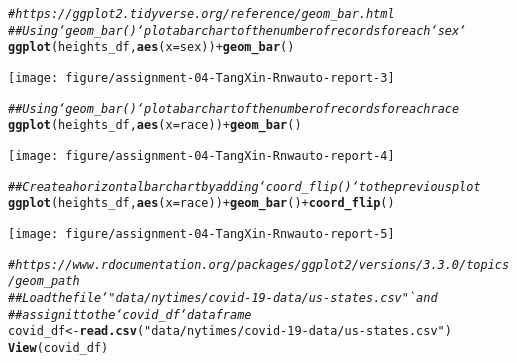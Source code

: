 \documentclass{article}\usepackage[]{graphicx}\usepackage[]{xcolor}
\makeatletter
\newcommand{\hlstr}[1]{\textcolor[rgb]{0.192,0.494,0.8}{#1}}%
\newcommand{\hlcom}[1]{\textcolor[rgb]{0.678,0.584,0.686}{\textit{#1}}}%
\newcommand{\hlopt}[1]{\textcolor[rgb]{0,0,0}{#1}}%
\newcommand{\hlstd}[1]{\textcolor[rgb]{0.345,0.345,0.345}{#1}}%
\newcommand{\hlkwb}[1]{\textcolor[rgb]{0.69,0.353,0.396}{#1}}%
\newcommand{\hlkwc}[1]{\textcolor[rgb]{0.333,0.667,0.333}{#1}}%
\newcommand{\hlkwd}[1]{\textcolor[rgb]{0.737,0.353,0.396}{\textbf{#1}}}%
\newenvironment{kframe}{%
 \def\at@end@of@kframe{}%
 \ifinner\ifhmode%
  \def\at@end@of@kframe{\end{minipage}}%
  \begin{minipage}{\columnwidth}%
 \fi\fi%
 \def\FrameCommand##1{\hskip\@totalleftmargin \hskip-\fboxsep
 \colorbox{shadecolor}{##1}\hskip-\fboxsep
     \hskip-\linewidth \hskip-\@totalleftmargin \hskip\columnwidth}%
 \MakeFramed {\advance\hsize-\width
   \@totalleftmargin\z@ \linewidth\hsize
   \@setminipage}}%
 {\par\unskip\endMakeFramed%
 \at@end@of@kframe}
\newenvironment{knitrout}{}{} %
\makeatother
\begin{document}
\begin{knitrout}
\begin{kframe}\begin{alltt}
\hlcom{# https://ggplot2.tidyverse.org/reference/geom_bar.html}
\hlcom{## Using `geom_bar()` plot a bar chart of the number of records for each `sex`}
\hlkwd{ggplot}\hlstd{(heights_df,} \hlkwd{aes}\hlstd{(}\hlkwc{x}\hlstd{=sex))} \hlopt{+} \hlkwd{geom_bar}\hlstd{()}
\end{alltt}
\end{kframe}

{\centering \texttt{[image: figure/assignment-04-TangXin-Rnwauto-report-3]} 

}


\begin{kframe}\begin{alltt}
\hlcom{## Using `geom_bar()` plot a bar chart of the number of records for each race}
\hlkwd{ggplot}\hlstd{(heights_df,} \hlkwd{aes}\hlstd{(}\hlkwc{x}\hlstd{=race))} \hlopt{+} \hlkwd{geom_bar}\hlstd{()}
\end{alltt}
\end{kframe}

{\centering \texttt{[image: figure/assignment-04-TangXin-Rnwauto-report-4]} 

}


\begin{kframe}\begin{alltt}
\hlcom{## Create a horizontal bar chart by adding `coord_flip()` to the previous plot}
\hlkwd{ggplot}\hlstd{(heights_df,} \hlkwd{aes}\hlstd{(}\hlkwc{x}\hlstd{=race))} \hlopt{+} \hlkwd{geom_bar}\hlstd{()} \hlopt{+} \hlkwd{coord_flip}\hlstd{()}
\end{alltt}
\end{kframe}

{\centering \texttt{[image: figure/assignment-04-TangXin-Rnwauto-report-5]} 

}


\begin{kframe}\begin{alltt}
\hlcom{# https://www.rdocumentation.org/packages/ggplot2/versions/3.3.0/topics/geom_path}
\hlcom{## Load the file `"data/nytimes/covid-19-data/us-states.csv"` and}
\hlcom{## assign it to the `covid_df` dataframe}
\hlstd{covid_df} \hlkwb{<-} \hlkwd{read.csv}\hlstd{(}\hlstr{"data/nytimes/covid-19-data/us-states.csv"}\hlstd{)}
\hlkwd{View}\hlstd{(covid_df)}


\end{alltt}
\end{kframe}
\end{knitrout}
\end{document}

